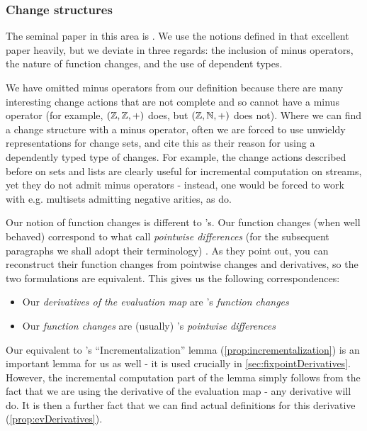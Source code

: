 \subsubsection{Change structures}
\label{sec:relatedChangeStructures}

The seminal paper in this area is \textcite{cai2014changes}. We use the notions
defined in that excellent paper heavily, but we deviate in three regards: the
inclusion of minus operators, the nature of function changes, and the use of
dependent types.

We have omitted minus operators from our definition because
there are many interesting change actions that are not complete and so cannot
have a minus operator (for example, $(\mathbb{Z},\mathbb{Z},+)$ does, but $(\mathbb{Z},\mathbb{N},+)$ does
not). Where we can find a change structure with a minus operator, often we are
forced to use unwieldy representations for change sets, and
\citeauthor{cai2014changes} cite this as their reason for using a dependently
typed type of changes. For example, the change actions described before on sets and lists are clearly
useful for incremental computation on streams, yet they do not admit minus operators - instead, one would
be forced to work with e.g. multisets admitting negative arities, as \citeauthor{cai2014changes} do.

Our notion of function changes is different to \citeauthor{cai2014changes}'s.
Our function changes (when well behaved) correspond to what \citeauthor{cai2014changes} call
\emph{pointwise differences} (for the subsequent paragraphs we shall adopt
their terminology) \autocite[See][section 2.2]{cai2014changes}. As they point out, you can reconstruct their
function changes from pointwise changes and derivatives, so the two formulations
are equivalent. This gives us the following correspondences:
\begin{itemize}
  \item Our \emph{derivatives of the evaluation map} are \citeauthor{cai2014changes}'s \emph{function changes}
  \item Our \emph{function changes} are (usually) \citeauthor{cai2014changes}'s \emph{pointwise differences}
\end{itemize}

Our equivalent to \citeauthor{cai2014changes}'s ``Incrementalization'' lemma
(\cref{prop:incrementalization}) is an important lemma for us as well - it is used
crucially in \cref{sec:fixpointDerivatives}. However, the incremental computation part of
the lemma simply follows from the fact that we are using the derivative of the
evaluation map - any derivative will do. It is then a further fact that we can
find actual definitions for this derivative (\cref{prop:evDerivatives}).

